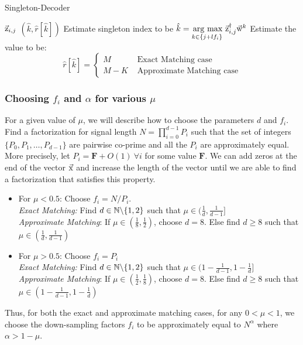 \begin{algorithm}[h!]
\caption{Singleton-Decoder}
\label{Algo:SingletonDecoder}
\begin{algorithmic}
 $\vec{\mathrm{z}}_{i,j}$
\vspace{\gap}
 $(\hat{k},\hat{r}[\hat{k}])$
\vspace{\gap}
\State Estimate singleton index to be $ \hat{k} = \underset{k\in\{j+l f_i\}}{\operatorname*{\,arg\ max}}\  \vec{\mathrm{z}}^{\dagger}_{i,j} \vec{\mathrm{w}}^{k}$
\vspace{\gap}
  \State Estimate the value to be:$$ \hat{r}[\hat{k}]=
   \begin{cases}
   M & \text{ Exact Matching case}\\
  M-K & \text{ Approximate Matching case}
  \end{cases}
  $$
\end{algorithmic}
\end{algorithm}

\subsubsection{Choosing $f_i$ and $\alpha$ for various $\mu$}
\label{subsec:DesignParameters}

For a given value of $\mu$, we will describe how to choose the parameters $d$ and $f_i$. Find a factorization for signal length $N=\prod_{i=0}^{d-1} P_i$ such that the set of integers $\{P_0,P_1,\ldots,P_{d-1}\}$ are pairwise co-prime and all the $P_i$ are approximately equal. More precisely, let $P_i=\mathbf{F}+O(1) ~\forall i$ for some value $\mathbf{F}$. We can add zeros at the end of the vector $\vec{\mathrm{x}}$ and increase the length of the vector until we are able to find a factorization that satisfies this property.
\begin{itemize}
	\item  For $\mu<0.5$: Choose $f_i = N/P_i$. \\
	{\it Exact Matching:} Find $d\in \mathbb{N}\backslash \{1,2\}$ such that $\mu\in(\frac{1}{d},\frac{1}{d-1}]$\\
	{\it Approximate Matching}: If $\mu\in(\frac{1}{8},\frac{1}{2})$, choose $d=8$. Else find $d\geq 8$ such that $\mu\in(\frac{1}{d},\frac{1}{d-1})$\\
    \item For $\mu>0.5$: Choose $f_i = P_i$\\
    {\it Exact Matching:} Find $d\in \mathbb{N}\backslash \{1,2\}$ such that $\mu\in(1-\frac{1}{d-1},1-\frac{1}{d}]$\\
    {\it Approximate Matching}: If $\mu\in(\frac{1}{2},\frac{1}{8})$, choose $d=8$. Else find $d\geq 8$ such that $\mu\in(1-\frac{1}{d-1},1-\frac{1}{d})$\\    	 
\end{itemize}
Thus, for both the exact and approximate matching cases, for any $0<\mu<1$, we choose the down-sampling factors $f_i$ to be approximately equal to $N^{\alpha}$ where $\alpha > 1- \mu$.


